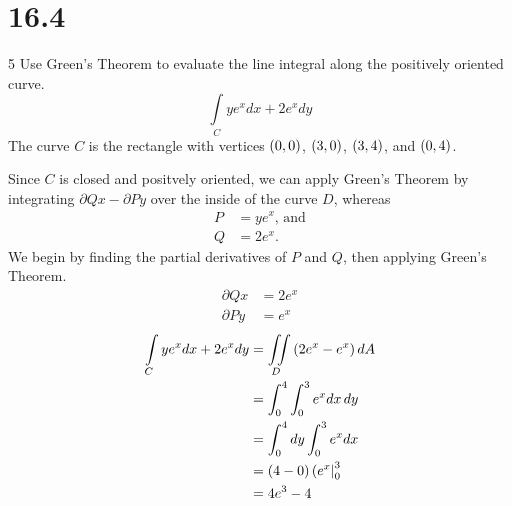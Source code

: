 \documentclass[12pt]{article}
\begin{document}
\section{16.4}{5}
Use Green's Theorem to evaluate the line integral along the positively oriented curve.
%
\begin{equation*}
\int\limits_C{ye^x{dx}+2e^x{dy}}
\end{equation*}
%
The curve $C$ is the rectangle with vertices $\left({0,0}\right)$, $\left({3,0}\right)$, $\left({3,4}\right)$, and $\left({0,4}\right)$.\double

Since $C$ is closed and positvely oriented, we can apply Green's Theorem by integrating $\partial{Q}{x}-\partial{P}{y}$ over the
inside of the curve $D$, whereas
%
\begin{align*}
P&=ye^x\text{, and}\\
Q&=2e^x.
\end{align*}
%
We begin by finding the partial derivatives of $P$ and $Q$, then applying Green's Theorem.
%
\begin{align*}
\partial{Q}{x}&=2e^x\\
\partial{P}{y}&=e^x
\end{align*}
\begin{align*}
\int\limits_C{ye^x{dx}+2e^x{dy}}&=\iint\limits_D\left({2e^x-e^x}\right)dA\\
&=\int_{0}^{4}\int_{0}^{3}{e^x}dx\,dy\\
&=\int_{0}^{4}dy\int_{0}^{3}{e^x}{dx}\\
&=\left({4-0}\right)\left(e^x\right|_{0}^{3}\\
&=4e^3-4
\end{align*}
\end{document}
